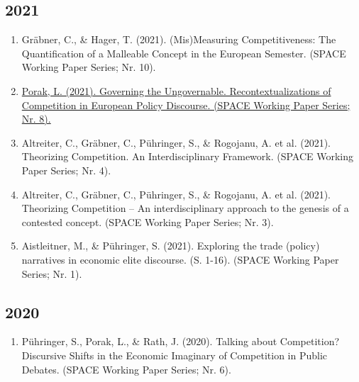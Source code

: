 \subsection*{2021}
\begin{enumerate}
	 \item Gräbner, C., \& Hager, T. (2021). (Mis)Measuring Competitiveness: The Quantification of a Malleable Concept in the European Semester. (SPACE Working Paper Series; Nr. 10).
	 \item \href{https://www.jku.at/fileadmin/gruppen/108/ICAE_Working_Papers/wp126.pdf}{Porak, L. (2021). Governing the Ungovernable. Recontextualizations of Competition in European Policy Discourse. (SPACE Working Paper Series; Nr. 8).}
	 \item Altreiter, C., Gräbner, C., Pühringer, S., \& Rogojanu, A. et al. (2021). Theorizing Competition. An Interdisciplinary Framework. (SPACE Working Paper Series; Nr. 4).
	 \item Altreiter, C., Gräbner, C., Pühringer, S., \& Rogojanu, A. et al. (2021). Theorizing Competition -- An interdisciplinary approach to the genesis of a contested concept. (SPACE Working Paper Series; Nr. 3).
	 \item Aistleitner, M., \& Pühringer, S. (2021). Exploring the trade (policy) narratives in economic elite discourse. (S. 1-16). (SPACE Working Paper Series; Nr. 1).
\end{enumerate}
\subsection*{2020}
\begin{enumerate}
	 \item Pühringer, S., Porak, L., \& Rath, J. (2020). Talking about Competition? Discursive Shifts in the Economic Imaginary of Competition in Public Debates. (SPACE Working Paper Series; Nr. 6).
\end{enumerate}
